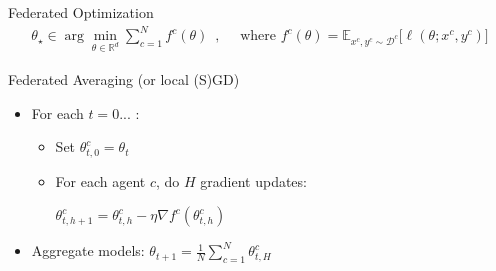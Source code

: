 \documentclass[aspectratio=169,14pt]{beamer}
\begin{document}
\begin{frame}[t]{Federated Optimization}
  \vspace{-3em}
  \begin{align*}
    \theta_\star \in \arg\min_{\theta \in \mathbb{R}^d} 
    \sum_{c=1}^N f^c(\theta)
    \enspace,
    \quad
    \text{ where }
    f^c(\theta) = \mathbb{E}_{x^c, y^c \sim \mathcal{D}^c} \Big[ \ell( \theta; x^c, y^c ) \Big]
  \end{align*}

  \pause
  
  \vspace{-1em}

  Federated Averaging (or local (S)GD)

  \vspace{-0.5em}
  
  \begin{itemize}
  \item For each $t = 0 ...$ :
    \begin{itemize}
      \normalsize
    \item Set $\theta_{t,0}^c = \theta_t$
    \item For each agent $c$, do $H$ gradient updates: \\[0.5em]
      
      \begin{center}
        $\theta_{t,h+1}^c = \theta_{t,h}^c - \eta \nabla f^c( \theta_{t,h}^c )$
      \end{center}
      
      \vspace{0.5em}
      
    \end{itemize}
  \item Aggregate models: $\theta_{t+1} = \frac{1}{N} \sum_{c=1}^N \theta_{t,H}^c$
  \end{itemize}

  \vspace{0.5em}

\end{frame}

  


  
\end{document}
